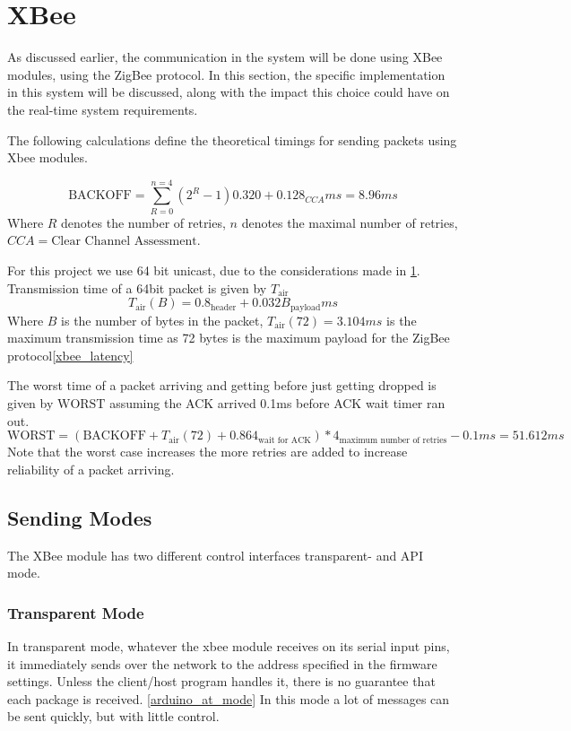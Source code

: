 \section{XBee}\label{sec:xbee}
As discussed earlier, the communication in the system will be done using XBee modules, using the ZigBee protocol. In this section, the specific implementation in this system will be discussed, along with the impact this choice could have on the real-time system requirements.

The following calculations define the theoretical timings for sending packets using Xbee modules.

\begin{equation*}
\text{BACKOFF} = \sum\limits_{R=0}^{n=4}(2^{R} - 1) 0.320 + 0.128_{CCA} ms = 8.96 ms
\end{equation*}
Where $R$ denotes the number of retries, $n$ denotes the maximal number of retries, $CCA = \text{Clear Channel Assessment}$.

For this project we use 64 bit unicast, due to the considerations made in \cref{sec:xbee}.
Transmission time of a 64bit packet is given by $T_{\text{air}}$
\begin{equation*}
T_{\text{air}}(B) = 0.8_{\text{header}} + 0.032B_{\text{payload}} ms
\end{equation*}
Where $B$ is the number of bytes in the packet, $T_{\text{air}}(72) = 3.104 ms$ is the maximum transmission time as 72 bytes is the maximum payload for the ZigBee protocol\cref{xbee_latency}

The worst time of a packet arriving and getting before just getting dropped is given by $\text{WORST}$ assuming the ACK arrived 0.1ms before ACK wait timer ran out.
\begin{equation*}
\text{WORST} = (\text{BACKOFF} + T_{\text{air}}(72) + 0.864_{\text{wait for ACK}})*4_{\text{maximum number of retries}} - 0.1 ms = 51.612 ms
\end{equation*}
Note that the worst case increases the more retries are added to increase reliability of a packet arriving.

\subsection{Sending Modes}
The XBee module has two different control interfaces transparent- and API mode.
\subsubsection{Transparent Mode}
In transparent mode, whatever the xbee module receives on its serial input pins, it immediately sends over the network to the address specified in the firmware settings. Unless the client/host program handles it, there is no guarantee that each package is received. \cref{arduino_at_mode}
In this mode a lot of messages can be sent quickly, but with little control.
